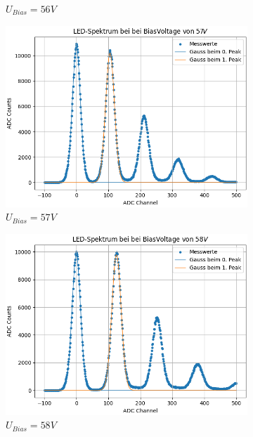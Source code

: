 \documentclass[12pt]{article}
\begin{document}
\begin{figure}[h!]
\begin{subfigure}{0.32\textwidth}
    \caption{$U_{Bias}=56V$}
  \end{subfigure}
  \hfill
  \begin{subfigure}{0.32\textwidth}
    \includegraphics[width=\textwidth]{Grafiken/gaussfit_57}
    \caption{$U_{Bias}=57V$}
  \end{subfigure}
  \hfill
  \begin{subfigure}{0.32\textwidth}
    \includegraphics[width=\textwidth]{Grafiken/gaussfit_58}
    \caption{$U_{Bias}=58V$}
  \end{subfigure}
  \hfill
  \begin{subfigure}{0.32\textwidth}

\end{subfigure}
\end{figure}
\end{document}
